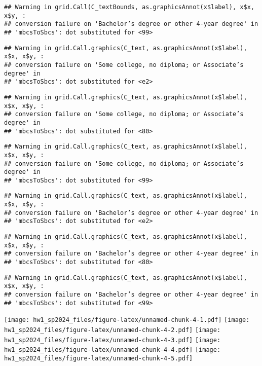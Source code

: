 \documentclass[
]{article}
\begin{document}
\begin{verbatim}
## Warning in grid.Call(C_textBounds, as.graphicsAnnot(x$label), x$x, x$y, :
## conversion failure on 'Bachelor’s degree or other 4-year degree' in
## 'mbcsToSbcs': dot substituted for <99>
\end{verbatim}

\begin{verbatim}
## Warning in grid.Call.graphics(C_text, as.graphicsAnnot(x$label), x$x, x$y, :
## conversion failure on 'Some college, no diploma; or Associate’s degree' in
## 'mbcsToSbcs': dot substituted for <e2>
\end{verbatim}

\begin{verbatim}
## Warning in grid.Call.graphics(C_text, as.graphicsAnnot(x$label), x$x, x$y, :
## conversion failure on 'Some college, no diploma; or Associate’s degree' in
## 'mbcsToSbcs': dot substituted for <80>
\end{verbatim}

\begin{verbatim}
## Warning in grid.Call.graphics(C_text, as.graphicsAnnot(x$label), x$x, x$y, :
## conversion failure on 'Some college, no diploma; or Associate’s degree' in
## 'mbcsToSbcs': dot substituted for <99>
\end{verbatim}

\begin{verbatim}
## Warning in grid.Call.graphics(C_text, as.graphicsAnnot(x$label), x$x, x$y, :
## conversion failure on 'Bachelor’s degree or other 4-year degree' in
## 'mbcsToSbcs': dot substituted for <e2>
\end{verbatim}

\begin{verbatim}
## Warning in grid.Call.graphics(C_text, as.graphicsAnnot(x$label), x$x, x$y, :
## conversion failure on 'Bachelor’s degree or other 4-year degree' in
## 'mbcsToSbcs': dot substituted for <80>
\end{verbatim}

\begin{verbatim}
## Warning in grid.Call.graphics(C_text, as.graphicsAnnot(x$label), x$x, x$y, :
## conversion failure on 'Bachelor’s degree or other 4-year degree' in
## 'mbcsToSbcs': dot substituted for <99>
\end{verbatim}

\texttt{[image: hw1\_sp2024\_files/figure-latex/unnamed-chunk-4-1.pdf]}
\texttt{[image: hw1\_sp2024\_files/figure-latex/unnamed-chunk-4-2.pdf]}
\texttt{[image: hw1\_sp2024\_files/figure-latex/unnamed-chunk-4-3.pdf]}
\texttt{[image: hw1\_sp2024\_files/figure-latex/unnamed-chunk-4-4.pdf]}
\texttt{[image: hw1\_sp2024\_files/figure-latex/unnamed-chunk-4-5.pdf]}
\end{document}
